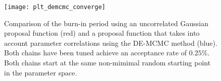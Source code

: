 \begin{figure}[h]
\begin{center}
\texttt{[image: plt\_demcmc\_converge]}
\end{center}
\caption{Comparison of the burn-in period using an uncorrelated Gaussian
proposal function (red) and a proposal function that takes into account
parameter correlations using the DE-MCMC method (blue).  Both chains have been
tuned achieve an acceptance rate of $0.25\%$.  Both chains start at the same
non-mimimal random starting point in the parameter space.}
\label{fig:burnin}
\end{figure}






